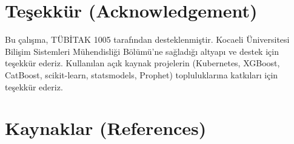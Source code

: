 \section*{Teşekkür (Acknowledgement)}

Bu çalışma, TÜBİTAK 1005 tarafından desteklenmiştir. Kocaeli Üniversitesi Bilişim Sistemleri Mühendisliği Bölümü'ne sağladığı altyapı ve destek için teşekkür ederiz. Kullanılan açık kaynak projelerin (Kubernetes, XGBoost, CatBoost, scikit-learn, statsmodels, Prophet) topluluklarına katkıları için teşekkür ederiz.

\section*{Kaynaklar (References)}

\begin{enumerate}[label={[\arabic*]}]


\end{enumerate}
